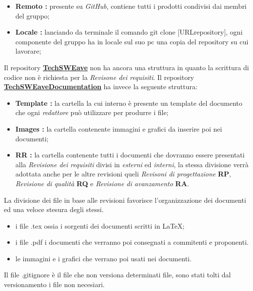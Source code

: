         \begin{itemize}
            \item \textbf{Remoto :} presente su \textit{GitHub}, contiene tutti i prodotti condivisi dai membri del gruppo;
            \item \textbf{Locale :} lanciando da terminale il comando {\selectfont git clone [URLrepository]}, ogni componente del gruppo ha in locale sul suo pc una copia del repository su cui lavorare;
        \end{itemize} 
        Il repository \textbf{\href{https://github.com/techsweave/TechSWEave.git}{TechSWEave}} non ha ancora una struttura in quanto la scrittura di codice non è richiesta per la \textit{Revisone dei requisiti}. 
        Il repository  \textbf{\href{https://github.com/techsweave/TechSWEaveDocumentation.git}{TechSWEaveDocumentation}} ha invece la seguente struttura:
        \begin{itemize}
            \item \textbf{Template :} la cartella la cui interno è presente un template del documento che ogni \textit{redattore} può utilizzare per produrre i file;
            \item \textbf{Images :} la cartella contenente immagini e grafici da inserire poi nei documenti;
            \item \textbf{RR :} la cartella contenente tutti i documenti che dovranno essere presentati alla \textit{Revisione dei requisiti} divisi in \textit{esterni} ed \textit{interni}, la stessa divisione verrà adottata anche per le altre revisioni queli \textit{Revisoni di progettazione} \textbf{RP}, \textit{Revisione di qualità} \textbf{RQ} e \textit{Revisione di avanzamento} \textbf{RA}.
        \end{itemize}
        La divisione dei file in base alle revisioni favorisce l'organizzazione dei documenti ed una veloce stesura degli stessi.
        \begin{itemize}
            \item i file {\selectfont .tex} ossia i sorgenti dei documenti scritti in \LaTeX;
            \item i file {\selectfont .pdf} i documenti che verranno poi consegnati a commitenti e proponenti.
            \item le immagini e i grafici che verrano poi usati nei documenti.
        \end{itemize}
        Il file {\selectfont .gitignore} è il file che non versiona determinati file, sono stati tolti dal versionamento i file non necesiari.
